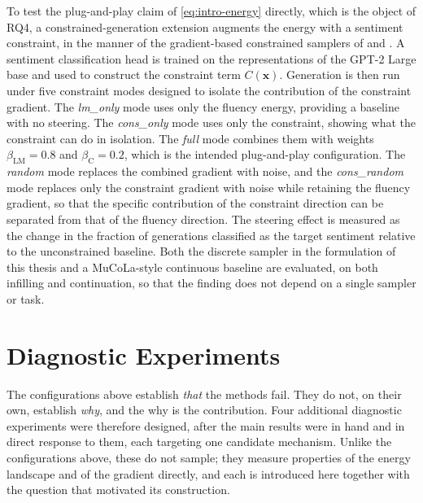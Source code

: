To test the plug-and-play claim of \eqref{eq:intro-energy} directly, which is the object of RQ4, a constrained-generation extension augments the energy with a sentiment constraint, in the manner of the gradient-based constrained samplers of \citet{kumar2022gradient} and \citet{qin2022cold}. A sentiment classification head is trained on the representations of the GPT-2 Large base and used to construct the constraint term $C(\bm{x})$. Generation is then run under five constraint modes designed to isolate the contribution of the constraint gradient. The \emph{lm\_only} mode uses only the fluency energy, providing a baseline with no steering. The \emph{cons\_only} mode uses only the constraint, showing what the constraint can do in isolation. The \emph{full} mode combines them with weights $\beta_{\text{LM}} = 0.8$ and $\beta_{\text{C}} = 0.2$, which is the intended plug-and-play configuration. The \emph{random} mode replaces the combined gradient with noise, and the \emph{cons\_random} mode replaces only the constraint gradient with noise while retaining the fluency gradient, so that the specific contribution of the constraint direction can be separated from that of the fluency direction. The steering effect is measured as the change in the fraction of generations classified as the target sentiment relative to the unconstrained baseline. Both the discrete sampler in the formulation of this thesis and a MuCoLa-style continuous baseline are evaluated, on both infilling and continuation, so that the finding does not depend on a single sampler or task.

\section{Diagnostic Experiments}
\label{sec:meth-diagnostics}

The configurations above establish \emph{that} the methods fail. They do not, on their own, establish \emph{why}, and the why is the contribution. Four additional diagnostic experiments were therefore designed, after the main results were in hand and in direct response to them, each targeting one candidate mechanism. Unlike the configurations above, these do not sample; they measure properties of the energy landscape and of the gradient directly, and each is introduced here together with the question that motivated its construction.

